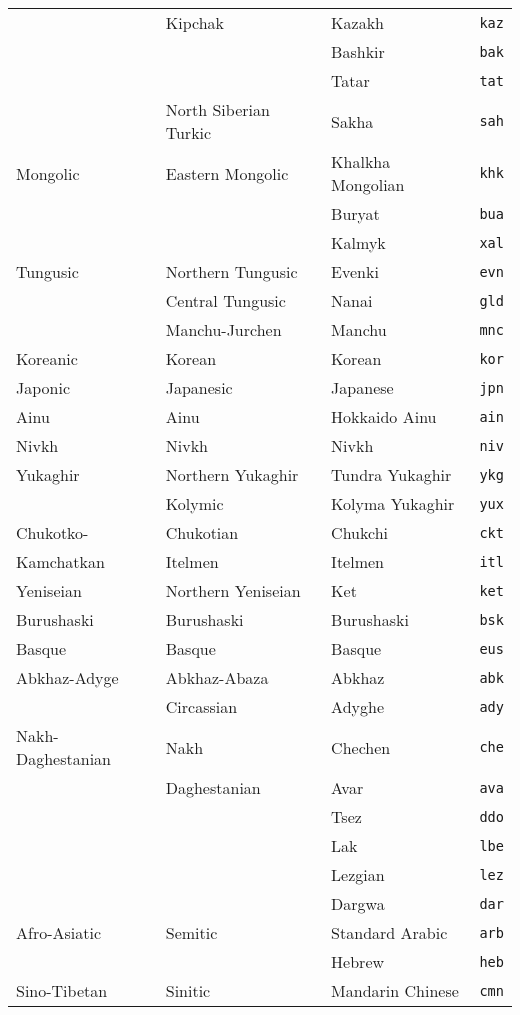 \begin{center}
\begin{longtable}{llll}
&Kipchak&Kazakh&\texttt{kaz}\\
&&Bashkir&\texttt{bak}\\
&&Tatar&\texttt{tat}\\
&North Siberian Turkic&Sakha&\texttt{sah}\\
\hline
Mongolic&Eastern Mongolic&Khalkha Mongolian&\texttt{khk}\\
&&Buryat&\texttt{bua}\\
&&Kalmyk&\texttt{xal}\\
\hline
Tungusic&Northern Tungusic&Evenki&\texttt{evn}\\
&Central Tungusic&Nanai&\texttt{gld}\\
&Manchu-Jurchen&Manchu&\texttt{mnc}\\
\hline
Koreanic&Korean&Korean&\texttt{kor}\\
\hline
Japonic&Japanesic&Japanese&\texttt{jpn}\\
\hline
Ainu&Ainu&Hokkaido Ainu&\texttt{ain}\\
\hline
Nivkh&Nivkh&Nivkh&\texttt{niv}\\
\hline
Yukaghir&Northern Yukaghir&Tundra Yukaghir&\texttt{ykg}\\
&Kolymic&Kolyma Yukaghir&\texttt{yux}\\
\hline
Chukotko-&Chukotian&Chukchi&\texttt{ckt}\\
Kamchatkan&Itelmen&Itelmen&\texttt{itl}\\
\hline
Yeniseian&Northern Yeniseian&Ket&\texttt{ket}\\
\hline
Burushaski&Burushaski&Burushaski&\texttt{bsk}\\
\hline
Basque&Basque&Basque&\texttt{eus}\\
\hline
Abkhaz-Adyge&Abkhaz-Abaza&Abkhaz&\texttt{abk}\\
&Circassian&Adyghe&\texttt{ady}\\
\hline
Nakh-Daghestanian&Nakh&Chechen&\texttt{che}\\
&Daghestanian&Avar&\texttt{ava}\\
&&Tsez&\texttt{ddo}\\
&&Lak&\texttt{lbe}\\
&&Lezgian&\texttt{lez}\\
&&Dargwa&\texttt{dar}\\
\hline
Afro-Asiatic&Semitic&Standard Arabic&\texttt{arb}\\
&&Hebrew&\texttt{heb}\\
\hline
Sino-Tibetan&Sinitic&Mandarin Chinese&\texttt{cmn}\\
\hline
\end{longtable}
 \addtocounter{table}{-1}
\end{center}

